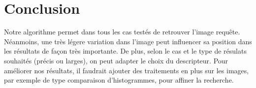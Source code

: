 \documentclass[a4paper]{article}
\begin{document}
\section{Conclusion}

Notre algorithme permet dans tous les cas testés de retrouver l'image requête. Néanmoins, une très légere variation dans l'image peut influencer 
sa position dans les résultats de façon très importante. 
De plus, selon le cas et le type de résulats souhaités (précis ou larges), on peut adapter le choix du descripteur.
Pour améliorer nos résultats, il faudrait ajouter des traitements en plus sur les images, par exemple de type comparaison d'histogrammes, pour affiner la recherche.
\end{document}
